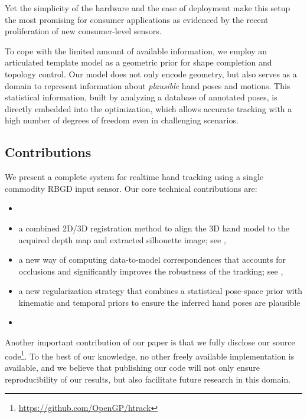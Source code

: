 Yet the simplicity of the hardware and the ease of deployment make this setup the most promising for consumer applications as evidenced by the recent proliferation of new consumer-level sensors.

To cope with the limited amount of available information, we employ an articulated template model as a geometric prior for shape completion and topology control. Our model does not only encode geometry, but also serves as a domain to represent information about \emph{plausible} hand poses and motions. This statistical information, built by analyzing a database of annotated poses, is directly embedded into the optimization, which
allows accurate tracking with a high number of degrees of freedom even in challenging scenarios.

\subsection*{Contributions}
% 
We present a complete system for realtime hand tracking using a single commodity RBGD input sensor. Our core technical contributions are:
% 


\begin {itemize}
\item {}
\item a combined 2D/3D registration method to align the 3D hand model to the acquired depth map and extracted silhouette image; see ,
\item a new way of computing data-to-model correspondences that accounts for occlusions and significantly improves the robustness of the tracking; see ,
\item a new regularization strategy that combines a statistical pose-space prior with kinematic and temporal priors to  ensure the inferred hand poses are plausible
\item {}
\end{itemize}

Another important contribution of our paper is that we fully disclose our source code\footnote{\url{https://github.com/OpenGP/htrack}}. To the best of our knowledge, no other freely available implementation is available, and we believe that publishing our code will not only ensure reproducibility of our results, but also facilitate future research in this domain.

